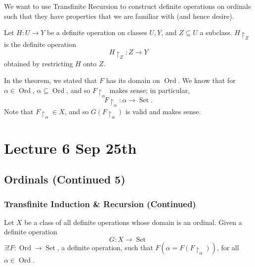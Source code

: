 \documentclass[notoc,notitlepage]{tufte-book}
\DeclareMathOperator{\Ord}{Ord }
\DeclareMathOperator{\Set}{Set }
\begin{document}
We want to use Transfinite Recursion to construct definite operations on ordinals such that they have properties that we are familiar with (and hence desire).

\begin{note}
  Let $H : U \to Y$ be a definite operation on classes $U, Y$, and $Z \subseteq U$ a subclass. $H \restriction_{Z}$ is the definite operation
  \begin{equation*}
    H \restriction_{Z} : Z \to Y
  \end{equation*}
  obtained by restricting $H$ onto $Z$.
\end{note}

\begin{note}
  In the theorem, we stated that $F$ has its domain on $\Ord$. We know that for $\alpha \in \Ord$, $\alpha \subseteq \Ord$, and so $F \restriction_{\alpha}$ makes sense; in particular,
  \begin{equation*}
    F \restriction_{\alpha} : \alpha \to \Set.
  \end{equation*}
  Note that $F \restriction_{\alpha} \in X$, and so $G(F \restriction_{\alpha})$ is valid and makes sense.
\end{note}




\chapter{Lecture 6 Sep 25th}%
\label{chp:lecture_6_sep_25th}

\section{Ordinals (Continued 5)}%
\label{sec:ordinals_continued_5}

\subsection{Transfinite Induction \& Recursion (Continued)}%
\label{sub:transfinite_induction_n_recursion_continued}

\begin{thm}
\label{thm:transfinite_recursion_v1}
  Let $X$ be a class of all definite operations whose domain is an ordinal. Given a definite operation
  \begin{equation*}
    G : X \to \Set
  \end{equation*}
  $\exists ! F : \Ord \to \Set$, a definite operation, such that $F(\alpha = F(F \restriction_{\alpha}))$, for all $\alpha \in \Ord$.
\end{thm}
\end{document}

